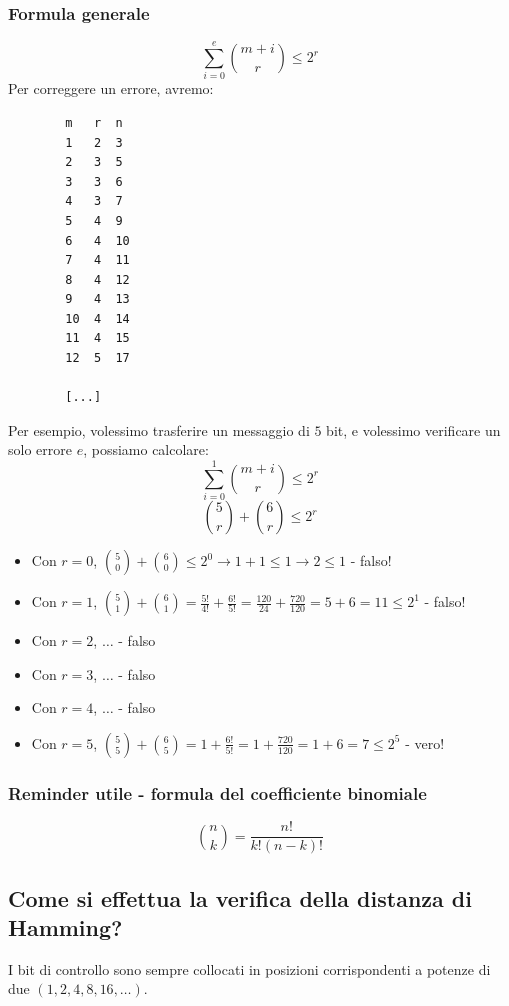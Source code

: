 \subsubsection{Formula generale}
$$
\sum _{i=0}^e \binom{m+i}{r} \leq 2^r
$$
Per correggere un errore, avremo:
\begin{footnotesize}
	\begin{verbatim}
		m   r  n  
		1   2  3  
		2   3  5  
		3   3  6  
		4   3  7  
		5   4  9  
		6   4  10 
		7   4  11 
		8   4  12 
		9   4  13 
		10  4  14 
		11  4  15 
		12  5  17 
		
		[...]
	\end{verbatim}
\end{footnotesize}

Per esempio, volessimo trasferire un messaggio di $5$ bit, e volessimo verificare un solo errore $e$, possiamo calcolare:
$$
\sum_{i=0}^{1} \binom{m+i}{r} \leq 2^r
$$
$$
\binom{5}{r} + \binom{6}{r} \leq 2^r
$$
\begin{itemize}
	\item Con $r=0$, $\binom{5}{0} + \binom{6}{0} \leq 2^0 \to 1 + 1 \leq 1 \to 2 \leq 1 $ - falso!
	\item Con $r=1$, $\binom{5}{1} + \binom{6}{1} = \frac{5!}{4!} + \frac{6!}{5!} = \frac{120}{24} + \frac{720}{120} = 5 + 6 = 11 \leq 2^1 $ - falso!
	\item Con $r=2$, $\dots$ - falso
	\item Con $r=3$, $\dots$ - falso
	\item Con $r=4$, $\dots$ - falso
	\item Con $r=5$, $\binom{5}{5} + \binom{6}{5} = 1 + \frac{6!}{5!} = 1 + \frac{720}{120} = 1 + 6 = 7 \leq 2^5 $ - vero!
\end{itemize}

\subsubsection{Reminder utile - formula del coefficiente binomiale}
$$
\binom{n}{k} = \frac{n!}{k!(n-k)!}
$$
\newpage

\subsection{Come si effettua la verifica della distanza di Hamming?}
I bit di controllo sono sempre collocati in posizioni corrispondenti a potenze di due $(1,2,4,8,16,\dots)$.

